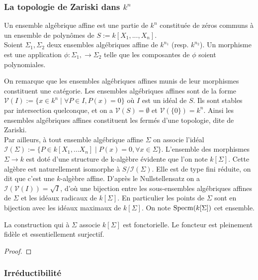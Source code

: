 \subsubsection{La topologie de Zariski dans $k^n$}
\begin{defn}
Un ensemble algébrique affine est une partie de $k^n$ constituée de zéros communs à un ensemble de polynômes de $S:=k[X_1,...,X_n]$.\\
Soient $\Sigma_1,\Sigma_2$ deux ensembles algébriques affine de $k^{n_1}$ (resp. $k^{n_2}$). Un morphisme est une application $\phi:\Sigma_1,\rightarrow \Sigma_2$ telle que les composantes de $\phi$ soient polynomiales.
\end{defn}
On remarque que les ensembles algébriques affines munis de leur morphismes constituent une catégorie. 
Les ensembles algébriques affines sont de la forme $\mathcal{V}(I):=\lbrace x\in k^n\mid \forall P\in I, P(x)=0\rbrace$ où $I$ est un idéal de $S$. Ils sont stables par intersection quelconque, et on a $\mathcal{V}(S)=\emptyset$ et $\mathcal{V}(\lbrace 0\rbrace)=k^n$. Ainsi les ensembles algébriques affines constituent les fermés d'une topologie, dite de Zariski.\\
Par ailleurs, à tout ensemble algébrique affine $\Sigma$ on associe l'idéal $\mathcal{I}(\Sigma):=\lbrace P\in k[X_1,...X_n] \mid P(x)=0, \forall x\in\Sigma \rbrace$. L'ensemble des morphismes $\Sigma\rightarrow k$ est doté d'une structure de k-algèbre évidente que l'on note $k[\Sigma]$. Cette algèbre est naturellement isomorphe à $S/\mathcal{I}(\Sigma)$. Elle est de type fini réduite, on dit que c'est une $k$-algèbre affine. D'après le Nullstellensatz on a $\mathcal{I}(\mathcal{V}(I))= \sqrt{I}$, d'où une bijection entre les sous-ensembles algébriques affines de $\Sigma$ et les idéaux radicaux de $k[\Sigma]$. En particulier les points de $\Sigma$ sont en bijection avec les idéaux maximaux de $k[\Sigma]$. On note $\operatorname{Specm} (k[\Sigma])$ cet ensemble.
\begin{prop}\label{eqaffinevaralg}
La construction qui à $\Sigma$ associe $k[\Sigma]$ est fonctorielle. Le foncteur est pleinement fidèle et essentiellement surjectif.
\end{prop}
\begin{proof}

\end{proof}
\subsubsection{Irréductibilité}
\begin{defn}

\end{defn}
